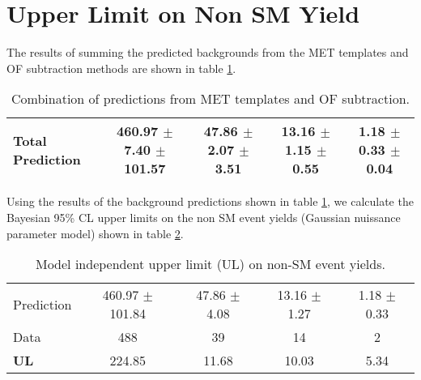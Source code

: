 \section{Upper Limit on Non SM Yield}
\label{sec:upperlimit}

The results of summing the predicted backgrounds from the MET templates and OF subtraction
methods are shown in table \ref{tab:systrestot}.


\begin{table}[hbt]
  \begin{center}
	\caption{
	  \label{tab:systrestot}
	  Combination of predictions from MET templates and OF subtraction.
	}
	\begin{tabular}{lcccc}
	  \hline
	  \resulttitle
\hline

Total Prediction & 460.97 $\pm$ 7.40 $\pm$ 101.57  &    47.86 $\pm$ 2.07 $\pm$ 3.51  &    13.16 $\pm$ 1.15 $\pm$ 0.55  &     1.18 $\pm$ 0.33 $\pm$ 0.04  \\

\hline
	\end{tabular}
  \end{center}
\end{table}



Using the results of the background predictions shown in table \ref{tab:systrestot},
we calculate the Bayesian 95\% CL
upper limits on the non SM event yields (Gaussian nuissance parameter model) shown in 
table \ref{tab:modinul}.

\begin{table}[hbt]
  \begin{center}
	\caption{
	  \label{tab:modinul}
	  Model independent upper limit (UL) on non-SM event yields.
	}
	\begin{tabular}{lcccc}
	  \hline
	  \resulttitle
\hline


Prediction & 460.97 $\pm$ 101.84  &    47.86 $\pm$ 4.08  &    13.16 $\pm$ 1.27  &     1.18 $\pm$ 0.33 \\

Data      &                488  &                   39  &                   14  &                    2  \\
\hline
{\bf UL}        &224.85  &  11.68  &  10.03  &  5.34\\

\hline
	\end{tabular}
  \end{center}
\end{table}


